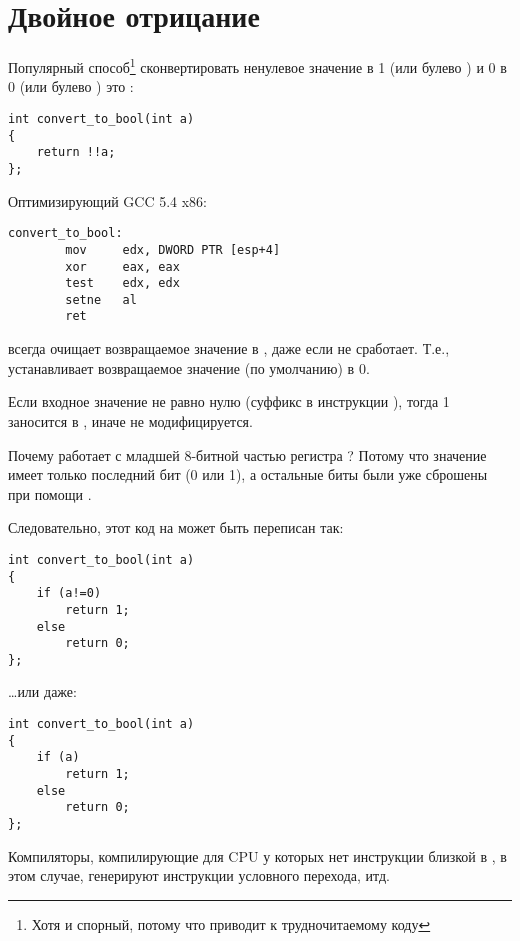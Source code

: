 \section{Двойное отрицание}

Популярный способ\footnote{Хотя и спорный, потому что приводит к трудночитаемому коду} сконвертировать ненулевое значение
в 1 (или булево ) и 0 в 0 (или булево ) это :

\begin{lstlisting}[style=customc]
int convert_to_bool(int a)
{
	return !!a;
};
\end{lstlisting}

Оптимизирующий GCC 5.4 x86:

\begin{lstlisting}[style=customasmx86]
convert_to_bool:
        mov     edx, DWORD PTR [esp+4]
        xor     eax, eax
        test    edx, edx
        setne   al
        ret
\end{lstlisting}

 всегда очищает возвращаемое значение в \EAX, даже если  не сработает.
Т.е.,  устанавливает возвращаемое значение (по умолчанию) в 0.

Если входное значение не равно нулю (суффикс  в инструкции ),
тогда 1 заносится в \AL, иначе \AL не модифицируется.

Почему  работает с младшей 8-битной частью регистра \EAX{}?
Потому что значение имеет только последний бит (0 или 1), а остальные биты были уже сброшены при помощи .

Следовательно, этот код на \CCpp может быть переписан так:

\begin{lstlisting}[style=customc]
int convert_to_bool(int a)
{
	if (a!=0)
		return 1;
	else
		return 0;
};
\end{lstlisting}

\dots или даже:

\begin{lstlisting}[style=customc]
int convert_to_bool(int a)
{
	if (a)
		return 1;
	else
		return 0;
};
\end{lstlisting}

Компиляторы, компилирующие для \ac{CPU} у которых нет инструкции близкой в
, в этом случае, генерируют инструкции условного перехода, итд.

